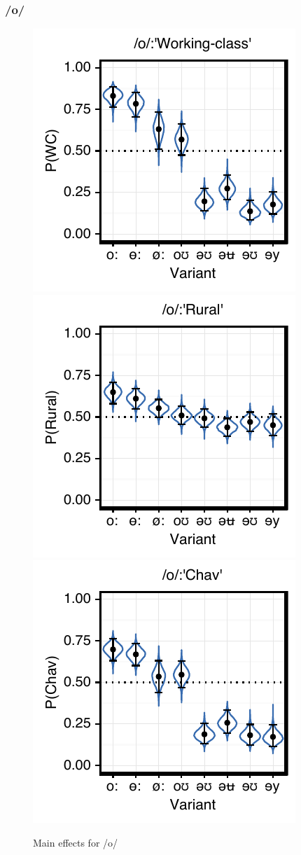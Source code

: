 \documentclass[PWPL]{article}
\begin{document}
\subsubsection{/o/}
\begin{figure}[ht]
\centering
\caption{Main effects for /o/}
\includegraphics[scale=0.65]{ow_class.pdf}
\includegraphics[scale=0.65]{ow_local.pdf}
\includegraphics[scale=0.65]{ow_chav.pdf}
\end{figure}
\end{document}
